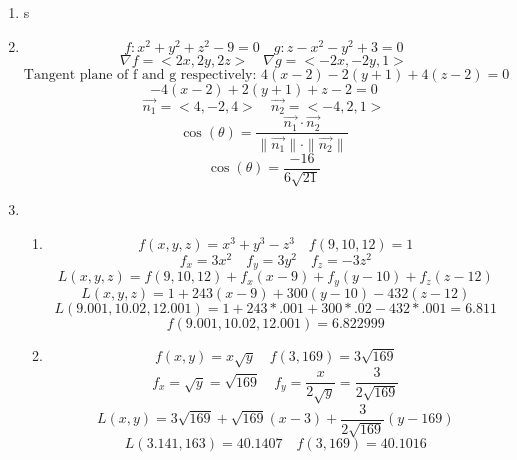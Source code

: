 \documentclass[12pt]{article}
\begin{document}
\begin{enumerate}
\item s
\item $$f:x^2+y^2+z^2-9=0 \quad g:z-x^2-y^2+3=0$$
$$\nabla f = <2x,2y,2z> \quad \nabla g = <-2x,-2y,1>$$
$$\textrm{Tangent plane of f and g respectively: } 4(x-2)-2(y+1)+4(z-2)=0$$
$$-4(x-2)+2 (y+1)+z-2=0$$
$$\vec{n_1} = <4,-2,4> \quad \vec{n_2} = <-4, 2,1>$$
$$\cos(\theta) = \frac{\vec{n_1} \cdot \vec{n_2}}{\parallel \vec{n_1} \parallel \cdot \parallel \vec{n_2} \parallel}$$
$$\cos(\theta) = \frac{-16}{6\sqrt{21}}$$
\item \begin{enumerate}
\item $$f\left(x,y,z\right)=x^3+y^3-z^3 \quad f\left(9,10,12\right) = 1$$
$$f_x = 3x^2 \quad f_y = 3y^2 \quad f_z = -3z^2$$
$$L(x,y,z) = f(9,10,12) + f_x(x-9)+f_y(y-10)+f_z(z-12)$$
$$L(x,y,z) = 1 + 243(x-9)+300(y-10)-432(z-12)$$
$$L(9.001,10.02,12.001)=1+243*.001+300*.02-432*.001=6.811$$
$$f(9.001,10.02,12.001)=6.822999$$
\item $$f(x,y)=x\sqrt{y} \quad f(3,169)=3\sqrt{169}$$
$$f_x=\sqrt{y}=\sqrt{169} \quad f_y=\frac{x}{2\sqrt{y}}=\frac{3}{2\sqrt{169}}$$
$$L(x,y) = 3\sqrt{169} + \sqrt{169}(x-3) + \frac{3}{2\sqrt{169}}(y-169)$$
$$L(3.141,163)=40.1407 \quad f(3,169)=40.1016$$
\end{enumerate}


\end{enumerate}
\end{document}
